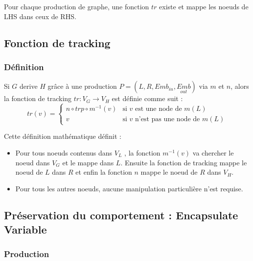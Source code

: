 \documentclass[a4paper, 12pt]{article}
\begin{document}
  Pour chaque production de graphe, une fonction $tr$ existe et mappe les noeuds de LHS dans ceux de RHS.

  \subsection{Fonction de tracking}

  \subsubsection{Définition}
  Si \(G\) derive \(H\) grâce à une production \( P = (L,R,Emb_{in} ,\underset{out}{Emb} ) \) via $m$ et $n$, alors la fonction de tracking $tr : {V_G} \rightarrow {V_H} $ est définie comme suit :
  \[ tr(v) =
  \begin{cases}
    n \circ trp \circ m^{-1}(v) & \text{si }v\text{ est une node de }m(L)\\
    v & \text{si }v\text{ n'est pas une node de }m(L)
  \end{cases}
  \]

  Cette définition mathématique définit :
  \begin{itemize}[label=\textbullet]
    \item Pour tous noeuds contenus dans \( {V_L} \) , la fonction \(m^{-1}(v)\) va chercher le noeud dans {$V_G$} et le mappe dans \( L \). Ensuite la fonction de tracking mappe le noeud de  \( L \)
    dans  $R$  et enfin la fonction \( n \) mappe le noeud de  \( R \)  dans {$V_H$}.
    \item Pour tous les autres noeuds, aucune manipulation particulière n'est requise.
  \end{itemize}

  \subsection{Préservation du comportement : Encapsulate Variable}

  \subsubsection{Production}
\end{document}
